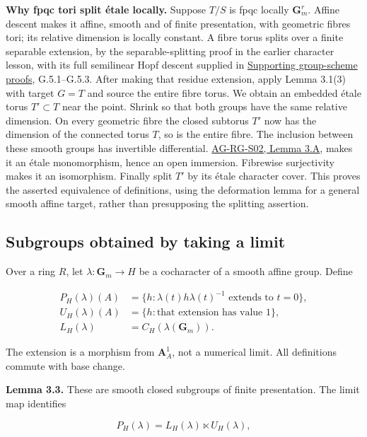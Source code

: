\documentclass[11pt,a4paper,openany]{report}
\begin{document}
\textbf{Why fpqc tori split étale locally.} Suppose \(T/S\) is fpqc locally \(\mathbf G_m^r\). Affine descent makes it affine, smooth and of finite presentation, with geometric fibres tori; its relative dimension is locally constant. A fibre torus splits over a finite separable extension, by the separable-splitting proof in the earlier character lesson, with its full semilinear Hopf descent supplied in \href{https://github.com/KokunoYumeto/open-math-courses/blob/main/docs/courses/AG-RG/AG-RG-S08.md}{Supporting group-scheme proofs}, G.5.1--G.5.3. After making that residue extension, apply Lemma 3.1(3) with target \(G=T\) and source the entire fibre torus. We obtain an embedded étale torus \(T'\subset T\) near the point. Shrink so that both groups have the same relative dimension. On every geometric fibre the closed subtorus \(T'\) now has the dimension of the connected torus \(T\), so is the entire fibre. The inclusion between these smooth groups has invertible differential. \href{AG-RG-S02.html\#smooth-map-differential}{AG-RG-S02, Lemma 3.A}, makes it an étale monomorphism, hence an open immersion. Fibrewise surjectivity makes it an isomorphism. Finally split \(T'\) by its étale character cover. This proves the asserted equivalence of definitions, using the deformation lemma for a general smooth affine target, rather than presupposing the splitting assertion.

\subsection{Subgroups obtained by taking a limit}\label{AG-RG-01-subgroups-obtained-by-taking-a-limit}

Over a ring \(R\), let \(\lambda:\mathbf G_m\to H\) be a cocharacter of a smooth affine group. Define

\[
\begin{aligned}
P_H(\lambda)(A)&=\{h:\lambda(t)h\lambda(t)^{-1}\text{ extends to }t=0\},\\
U_H(\lambda)(A)&=\{h:\text{that extension has value }1\},\\
L_H(\lambda)&=C_H(\lambda(\mathbf G_m)).
\end{aligned}
\]

The extension is a morphism from \(\mathbf A^1_A\), not a numerical limit. All definitions commute with base change.

\textbf{Lemma 3.3.} These are smooth closed subgroups of finite presentation. The limit map identifies

\[
P_H(\lambda)=L_H(\lambda)\ltimes U_H(\lambda),
\]
\end{document}
